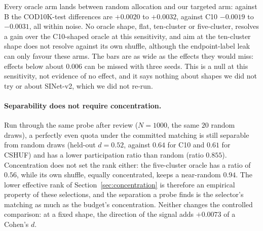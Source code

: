 \documentclass{article}
\newif\ifrevmarked \revmarkedtrue
\newenvironment{revblock}[1]{\ifrevmarked\color{#1}\fi}{}
\begin{document}
\begin{revblock}{RevB}
Every oracle arm lands between random allocation and our targeted arm: against B the COD10K-test differences are
$+0.0020$ to $+0.0032$, against C10 $-0.0019$ to $-0.0031$, all within noise. No oracle shape, flat, ten-cluster or
five-cluster, resolves a gain over the C10-shaped oracle at this sensitivity, and aim at the ten-cluster shape does
not resolve against its own shuffle, although the endpoint-label leak can only favour these arms. The bars are as wide
as the effects they would miss: effects below about $0.006$ can be missed with three seeds. This is a null at this
sensitivity, not evidence of no effect, and it says nothing about shapes we did not try or about SINet-v2, which we
did not re-run.

\paragraph{Separability does not require concentration.} Run through the same probe after review ($N = 1000$, the
same $20$ random draws), a perfectly even quota under the committed matching is still separable from random draws
(held-out $d = 0.52$, against $0.64$ for C10 and $0.61$ for CSHUF) and has a lower participation ratio than random
(ratio $0.855$). Concentration does not set the rank either: the five-cluster oracle has a ratio of $0.56$, while its
own shuffle, equally concentrated, keeps a near-random $0.94$. The lower effective rank of Section~\ref{sec:concentration}
is therefore an empirical property of these selections, and the separation a probe finds is the selector's matching
as much as the budget's concentration. Neither changes the controlled comparison: at a fixed shape, the direction of the
signal adds $+0.0073$ of a Cohen's $d$.
\end{revblock}
\end{document}
